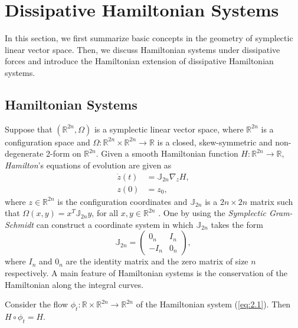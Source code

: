 \section{Dissipative Hamiltonian Systems} \label{sec:2}
In this section, we first summarize basic concepts in the geometry of symplectic linear vector space. Then, we discuss Hamiltonian systems under dissipative forces and introduce the Hamiltonian extension of dissipative Hamiltonian systems.

\subsection{Hamiltonian Systems} \label{sec:2.1} Suppose that $(\mathbb{R}^{2n},\Omega)$ is a symplectic linear vector space, where $\mathbb{R}^{2n}$ is a configuration space and $\Omega:\mathbb{R}^{2n}\times \mathbb{R}^{2n} \to \mathbb R$ is a closed, skew-symmetric and non-degenerate 2-form on $\mathbb{R}^{2n}$. Given a smooth Hamiltonian function $H:\mathbb{R}^{2n}\to \mathbb R$, \emph{Hamilton}'s equations of evolution are given as
\begin{equation} \label{eq:2.1}
	\begin{aligned}
	\dot {z}(t) &= \mathbb J_{2n} \nabla_{z} H, \\
	z(0) &= z_0,
	\end{aligned}
\end{equation}
where $z \in\mathbb R^{2n}$ is the configuration coordinates and $\mathbb J_{2n}$ is a $2n\times 2n$ matrix such that $\Omega(x,y) = x^T \mathbb J_{2n} y$, for all $x,y\in \mathbb R^{2n}$ \cite{Marsden:2010:IMS:1965128}. One by using the \emph{Symplectic Gram-Schmidt} \cite{de2006symplectic} can construct a coordinate system in which $\mathbb J_{2n}$ takes the form
\begin{equation} \label{eq:2.2}
	\mathbb{J}_{2n} = 
	\begin{pmatrix}
		0_n & I_n \\
		-I_n & 0_n
	\end{pmatrix},
\end{equation}
where $I_n$ and $0_n$ are the identity matrix and the zero matrix of size $n$ respectively. A main feature of Hamiltonian systems is the conservation of the Hamiltonian along the integral curves.
\begin{theorem} \label{theorem:2.1}
\cite{Marsden:2010:IMS:1965128} Consider the flow $\phi_t:\mathbb R\times \mathbb R^{2n} \to \mathbb R^{2n}$ of the Hamiltonian system (\ref{eq:2.1}). Then $H\circ \phi_t = H$.
\end{theorem}

